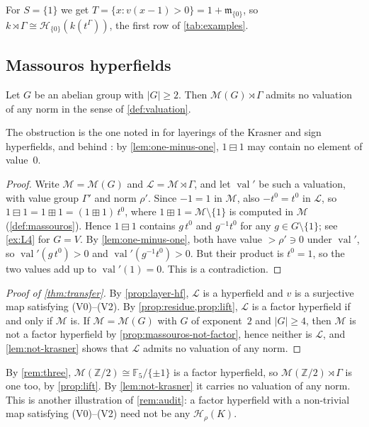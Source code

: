 \documentclass[11pt]{amsart}
\numberwithin{equation}{section}
\newcommand{\hplus}{\boxplus}
\newcommand{\hminus}{\boxminus}
\newcommand{\val}{\operatorname{val}}
\newcommand{\m}{\mathfrak m}
\newcommand{\Hr}{\mathcal H_\rho}
\newcommand{\Mas}{\mathcal M}
\newcommand{\Lay}{\mathcal L}
\newcommand{\Z}{\mathbb Z}
\newcommand{\F}{\mathbb F}
\newcommand{\lt}[2]{#1\,t^{#2}}
\begin{document}
For $S=\{1\}$ we get $T=\{x:v(x-1)>0\}=1+\m_{\{0\}}$, so $k\rtimes\Gamma\cong\mathcal H_{\{0\}}(k(t^\Gamma))$, the first row of \cref{tab:examples}.

\subsection{Massouros hyperfields}

\begin{lemma}\label{lem:not-krasner}
Let $G$ be an abelian group with $|G|\ge2$. Then $\Mas(G)\rtimes\Gamma$ admits no valuation of any norm in the sense of \cref{def:valuation}.
\end{lemma}

The obstruction is the one noted in \cite[\S2, after Theorem~2.2]{LT25} for layerings of the Krasner and sign hyperfields, and behind \cite[Proposition~4.14]{Linzi25}: by \cref{lem:one-minus-one}, $1\hminus1$ may contain no element of value~$0$.

\begin{proof}
Write $\Mas=\Mas(G)$ and $\Lay=\Mas\rtimes\Gamma$, and let $\val'$ be such a valuation, with value group $\Gamma'$ and norm $\rho'$. Since $-1=1$ in $\Mas$, also $-t^0=t^0$ in $\Lay$, so $1\hminus1=1\hplus1=\lt{(1\hplus1)}{0}$, where $1\hplus1=\Mas\setminus\{1\}$ is computed in $\Mas$ (\cref{def:massouros}). Hence $1\hminus1$ contains $g\,t^0$ and $g^{-1}t^0$ for any $g\in G\setminus\{1\}$; see \cref{ex:L4} for $G=V$. By \cref{lem:one-minus-one}, both have value $>\rho'\ni0$ under $\val'$, so $\val'(g\,t^0)>0$ and $\val'(g^{-1}t^0)>0$. But their product is $t^0=1$, so the two values add up to $\val'(1)=0$. This is a contradiction.
\end{proof}

\begin{proof}[Proof of \cref{thm:transfer}]
By \cref{prop:layer-hf}, $\Lay$ is a hyperfield and $v$ is a surjective map satisfying (V0)--(V2). By \cref{prop:residue,prop:lift}, $\Lay$ is a factor hyperfield if and only if $\Mas$ is. If $\Mas=\Mas(G)$ with $G$ of exponent~$2$ and $|G|\ge4$, then $\Mas$ is not a factor hyperfield by \cref{prop:massouros-not-factor}, hence neither is $\Lay$, and \cref{lem:not-krasner} shows that $\Lay$ admits no valuation of any norm.
\end{proof}

By \cref{rem:three}, $\Mas(\Z/2)\cong\F_5/\{\pm1\}$ is a factor hyperfield, so $\Mas(\Z/2)\rtimes\Gamma$ is one too, by \cref{prop:lift}. By \cref{lem:not-krasner} it carries no valuation of any norm. This is another illustration of \cref{rem:audit}: a factor hyperfield with a non-trivial map satisfying (V0)--(V2) need not be any $\Hr(K)$.
\end{document}
